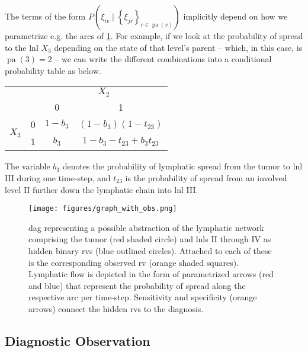 \documentclass[twocolumn]{aastex631}
\begin{document}
The terms of the form $P \left( \xi_{iv} \mid \left\{ \xi_{jr} \right\}_{r \in \operatorname{pa}(v)} \right)$ implicitly depend on how we parametrize e.g. the arcs of \cref{fig:graph_with_obs}. For example, if we look at the probability of spread to the \gls{lnl} $X_3$ depending on the state of that level's parent -- which, in this case, is $\operatorname{pa}(3) = 2$ -- we can write the different combinations into a conditional probability table as below.

\noindent
\begin{center}
    \begin{tabular}{|cc|cc|}
        \hline
        & & \multicolumn{2}{c|}{$X_2$} \\
        & & 0 & 1 \\
        \hline
        \multirow{2}{*}{$X_3$} & 0 & $1 - b_3$ & $(1 - b_3)(1 - t_{23})$ \\
        & 1 & $b_3$ & $1 - b_3 - t_{23} + b_3 t_{23}$ \\
        \hline
    \end{tabular}
\end{center}

The variable $b_3$ denotes the probability of lymphatic spread from the tumor to \gls{lnl} III during one time-step, and $t_{23}$ is the probability of spread from an involved level II further down the lymphatic chain into \gls{lnl} III. 

\begin{figure}
    \centering
    \texttt{[image: figures/graph\_with\_obs.png]}
    \caption{\Gls{dag} representing a possible abstraction of the lymphatic network comprising the tumor (red shaded circle) and \glspl{lnl} II through IV as hidden binary \glspl{rv} (blue outlined circles). Attached to each of these is the corresponding observed \gls{rv} (orange shaded squares). Lymphatic flow is depicted in the form of parametrized arrows (red and blue) that represent the probability of spread along the respective arc per time-step. Sensitivity and specificity (orange arrows) connect the hidden \glspl{rv} to the diagnosis.}
    \label{fig:graph_with_obs}
\end{figure}


\subsection{Diagnostic Observation}
\label{subsec:formalism:diagnosis}
\end{document}
